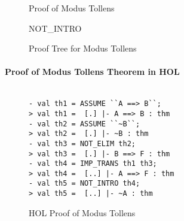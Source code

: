 \begin{figure}[t]
  \centering
  \caption{Proof of Modus Tollens}
  \label{fig:example-proof-2}
\end{figure}

\begin{figure}[t]
  \centering
  \begin{scriptsize}
     {}
    {NOT\_INTRO}
  \end{scriptsize}

  \caption{Proof Tree for Modus Tollens}
  \label{fig:proof-tree-2}
\end{figure}



\paragraph*{Proof of Modus Tollens Theorem in HOL}

\begin{figure}[t]
  \centering
  \begin{small}
    \begin{session}
\begin{verbatim}

- val th1 = ASSUME ``A ==> B``;
> val th1 =  [.] |- A ==> B : thm
- val th2 = ASSUME ``~B``;
> val th2 =  [.] |- ~B : thm
- val th3 = NOT_ELIM th2;
> val th3 =  [.] |- B ==> F : thm
- val th4 = IMP_TRANS th1 th3;
> val th4 =  [..] |- A ==> F : thm
- val th5 = NOT_INTRO th4;
> val th5 =  [..] |- ~A : thm
\end{verbatim}
    \end{session}
  \end{small}
  \caption{HOL Proof of Modus Tollens}
  \label{fig:hol-proof-2}
\end{figure}

